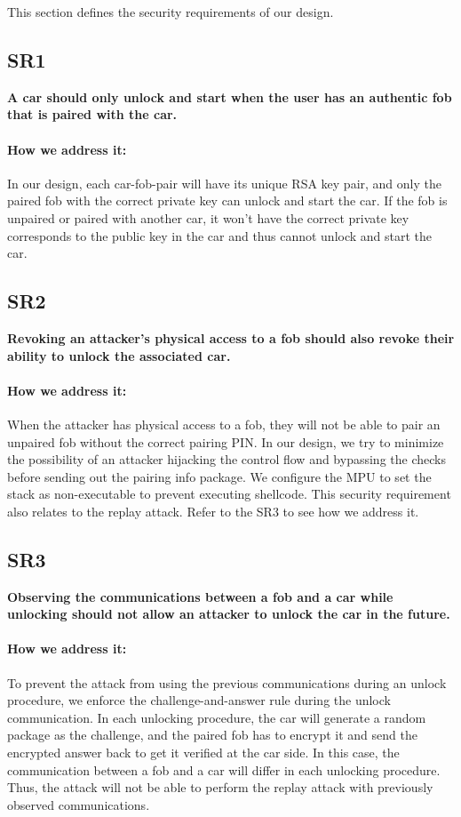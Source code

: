 \documentclass[11pt,oneside,onecolumn,letterpaper]{article}
\begin{document}
This section defines the security requirements of our design.

\subsection{SR1}
\textbf{A car should only unlock and start when the user has an authentic fob that is paired with the car.}

\paragraph{How we address it:}
In our design, each car-fob-pair will have its unique RSA key pair, and only the paired fob with the correct private key can unlock and start the car.
If the fob is unpaired or paired with another car, it won't have the correct private key corresponds to the public key in the car and thus cannot unlock and start the car.

\subsection{SR2}
\textbf{Revoking an attacker's physical access to a fob should also revoke their ability to unlock the associated car.}

\paragraph{How we address it:}
When the attacker has physical access to a fob, they will not be able to pair an unpaired fob without the correct pairing PIN.
In our design, we try to minimize the possibility of an attacker hijacking the control flow and bypassing the checks before sending out the pairing info package.
We configure the MPU to set the stack as non-executable to prevent executing shellcode.
This security requirement also relates to the replay attack. Refer to the SR3 to see how we address it.

\subsection{SR3}
\textbf{Observing the communications between a fob and a car while unlocking should not allow an attacker to unlock the car in the future.}

\paragraph{How we address it:}
To prevent the attack from using the previous communications during an unlock procedure, we enforce the challenge-and-answer rule during the unlock communication.
In each unlocking procedure, the car will generate a random package as the challenge, and the paired fob has to encrypt it and send the encrypted answer back to get it verified at the car side.
In this case, the communication between a fob and a car will differ in each unlocking procedure.
Thus, the attack will not be able to perform the replay attack with previously observed communications.
\end{document}
